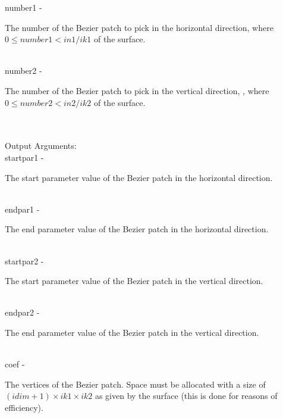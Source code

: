         \>\>    {\fov number1}\> - \>
        \begin{minipg2}
          The number of the Bezier patch to pick in the horizontal
          direction, where $0\leq number1<in1/ik1$ of the surface.
        \end{minipg2}\\[0.8ex]
        \>\>    {\fov number2}\> - \>
        \begin{minipg2}
          The number of the Bezier patch to pick in the vertical
          direction, , where $0\leq number2<in2/ik2$ of the surface.
        \end{minipg2}\\[0.8ex]
\\
        \>Output Arguments:\\
        \>\>    {\fov startpar1}        \> - \> \begin{minipg2}
                                The start parameter value of the Bezier
                                patch in the horizontal direction.
                                \end{minipg2}\\[0.8ex]
        \>\>    {\fov endpar1}  \> - \> \begin{minipg2}
                                The end parameter value of the Bezier
                                patch in the horizontal direction.
                                \end{minipg2}\\[0.8ex]
        \>\>    {\fov startpar2}        \> - \> \begin{minipg2}
                                The start parameter value of the Bezier patch                           in the vertical direction.
                                \end{minipg2}\\[0.8ex]
        \>\>    {\fov endpar2}  \> - \> \begin{minipg2}
                                The end parameter value of the Bezier patch                             in the vertical direction.
                                \end{minipg2}\\[0.8ex]
        \>\>    {\fov coef}     \> - \>
        \begin{minipg2}
          The vertices of the Bezier patch.
          Space must be allocated with a size of $(idim+1)\times ik1\times ik2$
          as given by the surface (this is done for reasons of efficiency).
        \end{minipg2}\\
